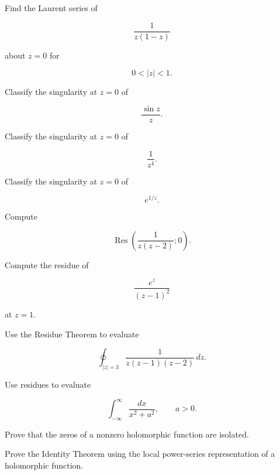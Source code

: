 \begin{exercise}[3]
Find the Laurent series of

\[
\frac{1}{z(1-z)}
\]

about \(z=0\) for

\[
0<|z|<1.
\]
\end{exercise}

\begin{exercise}[3]
Classify the singularity at \(z=0\) of

\[
\frac{\sin z}{z}.
\]
\end{exercise}

\begin{exercise}[3]
Classify the singularity at \(z=0\) of

\[
\frac1{z^4}.
\]
\end{exercise}

\begin{exercise}[3]
Classify the singularity at \(z=0\) of

\[
e^{1/z}.
\]
\end{exercise}

\begin{exercise}[3]
Compute

\[
\operatorname{Res}
\left(
\frac{1}{z(z-2)};
0
\right).
\]
\end{exercise}

\begin{exercise}[3]
Compute the residue of

\[
\frac{e^z}{(z-1)^2}
\]

at \(z=1\).
\end{exercise}

\begin{exercise}[3]
Use the Residue Theorem to evaluate

\[
\oint_{|z|=3}
\frac{1}{z(z-1)(z-2)}
\,dz.
\]
\end{exercise}

\begin{exercise}[3]
Use residues to evaluate

\[
\int_{-\infty}^{\infty}
\frac{dx}{x^2+a^2},
\qquad
a>0.
\]
\end{exercise}

\begin{exercise}[4]
Prove that the zeros of a nonzero holomorphic function are isolated.
\end{exercise}

\begin{exercise}[4]
Prove the Identity Theorem using the local power-series representation of
a holomorphic function.
\end{exercise}

